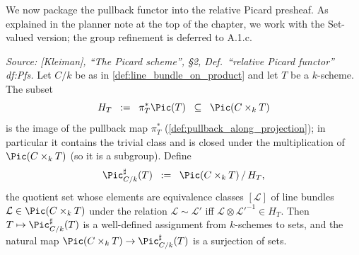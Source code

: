 We now package the pullback functor into the relative Picard presheaf. As
explained in the planner note at the top of the chapter, we work with the
Set-valued version; the group refinement is deferred to A.1.c.

\begin{theorem}
  \label{thm:relative_pic_quotient_well_defined}
  
  \textit{Source: [Kleiman], ``The Picard scheme'', §2,
  Def.~``relative Picard functor'' df:Pfs.}
  Let \(C/k\) be as in \cref{def:line_bundle_on_product} and let \(T\) be a
  \(k\)-scheme. The subset
  \[
    H_T \;\;:=\;\; \pi_T^* \Pic(T) \;\;\subseteq\;\; \Pic(C \times_k T)
  \]
  is the image of the pullback map \(\pi_T^*\)
  (\cref{def:pullback_along_projection}); in particular it contains the trivial
  class and is closed under the multiplication of \(\Pic(C \times_k T)\) (so it is
  a subgroup). Define
  \[
    \Pic^\sharp_{C/k}(T) \;\;:=\;\; \Pic(C \times_k T) \, / \, H_T,
  \]
  the quotient set whose elements are equivalence classes \([\mathcal{L}]\) of
  line bundles \(\mathcal{L} \in \Pic(C \times_k T)\) under the relation
  \(\mathcal{L} \sim \mathcal{L}'\) iff
  \(\mathcal{L} \otimes \mathcal{L}'^{-1} \in H_T\).
  Then \(T \mapsto \Pic^\sharp_{C/k}(T)\) is a well-defined assignment from
  \(k\)-schemes to sets, and the natural map
  \(\Pic(C \times_k T) \to \Pic^\sharp_{C/k}(T)\) is a surjection of sets.
\end{theorem}


